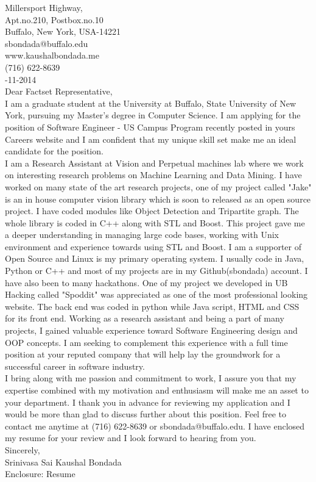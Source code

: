 \documentclass[10pt,letterpaper,oneside]{article}
\begin{document}
 Millersport Highway,\\
Apt.no.210, Postbox.no.10\\
Buffalo, New York, USA-14221\\
sbondada@buffalo.edu\\
www.kaushalbondada.me\\
(716) 622-8639\\

-11-2014\\
 
\noindent Dear Factset Representative,\\
 
I am a graduate student at the University at Buffalo, State University of New York, pursuing my
Master's degree in Computer Science. I am applying for the position of Software Engineer - US Campus
Program recently posted in yours Careers website and I am confident that my unique skill set make me an ideal candidate for the position.\\

I am a Research Assistant at Vision and Perpetual machines lab where we work on interesting research problems on
Machine Learning and Data Mining. I have worked on many state of the art research projects, one of my
project called "Jake" is an in house computer vision library which is soon to released as an
open source project. I have coded modules like Object Detection and Tripartite graph. The whole library
is coded in C++ along with STL and Boost. This project gave me a deeper understanding in managing large code bases, working with Unix environment and experience towards using STL and Boost. I am a supporter of Open Source and 
Linux is my primary operating system. I usually code in Java, Python or C++ and most of my projects are in my Github(sbondada) account. I have also been to many hackathons.
One of my project we developed in UB Hacking called "Spoddit" was appreciated as one of the most professional looking website. The back end
was coded in python while Java script, HTML and CSS for its front end. Working as a research assistant and being a part of many projects, I
gained valuable experience toward Software Engineering design and OOP concepts. I am seeking to complement this experience with a full time position at your reputed company that will help lay the groundwork for a successful career in software industry.\\

I bring along with me passion and commitment to work, I assure you that my expertise combined with my motivation
and enthusiasm will make me an asset to your department. I thank you in advance for reviewing my application and I would be more than glad to
discuss further about this position. Feel free to contact me anytime at (716) 622-8639 or sbondada@buffalo.edu. I have enclosed my resume for your review and I look forward to hearing from you.\\
 
\noindent Sincerely,\\
Srinivasa Sai Kaushal Bondada\\
Enclosure: Resume\\
\end{document}
